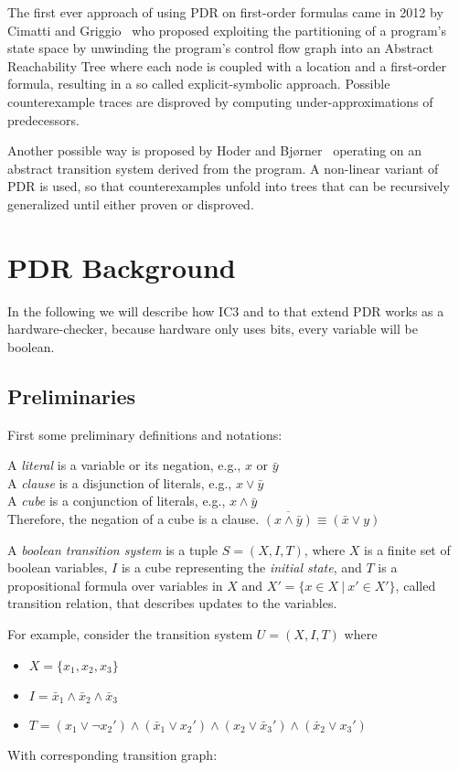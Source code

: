 \documentclass[11pt, a4paper, BCOR=10mm, ngerman, oneside]{scrbook}
\begin{document}
The first ever approach of using PDR on first-order formulas came in 2012 by Cimatti and Griggio~\cite{DBLP:conf/cav/CimattiG12} who proposed exploiting the partitioning of a program's state space by unwinding the program's control flow graph into an Abstract Reachability Tree where each node is coupled with a location and a first-order formula, resulting in a so called explicit-symbolic approach. Possible counterexample traces are disproved by computing under-approximations of predecessors. 

Another possible way is proposed by Hoder and Bj{\o}rner~\cite{DBLP:conf/sat/HoderB12} operating on an abstract transition system derived from the program. A non-linear variant of PDR is used, so that counterexamples unfold into trees that can be recursively generalized until either proven or disproved.







\chapter{PDR Background}
\label{PDR}
In the following we will describe how IC3 and to that extend PDR works as a hardware-checker, because hardware only uses bits, every variable will be boolean.
\section{Preliminaries}
First some preliminary definitions and notations:  \par
A \textsl{literal} is a variable or its negation, e.g., $x \text{ or } \bar y$ \\
A \textsl{clause} is a disjunction of literals, e.g., $x \lor \bar y$ \\
A \textsl{cube} is a conjunction of literals, e.g.,  $x \land \bar y$ \\
Therefore, the negation of a cube is a clause. $\overline{(x \land \bar y)} \equiv (\bar x \lor y)$  \par
A \textsl{boolean transition system} is a tuple $S = (X, I, T)$, where $X$ is a finite set of boolean variables, $I$ is a cube representing the \textsl{initial state}, and $T$ is a propositional formula over variables in $X$ and $X' = \{x \in X \ | \ x' \in X'\}$, called transition relation, that describes updates to the variables.
\par
For example, consider the transition system $U = (X, I, T)$ where
\begin{itemize}
\item $ X= \{x_1, x_2, x_3\}$
\item $I = \bar x_1 \land \bar x_2 \land \bar x_3$
\item $T = (x_1 \lor \neg x_2' ) \land ( \bar x_1 \lor x_2') \land (x_2 \lor \bar x_3') \land ( \bar x_2 \lor x_3')$
\end{itemize}
\pagebreak
With corresponding transition graph:
\end{document}

